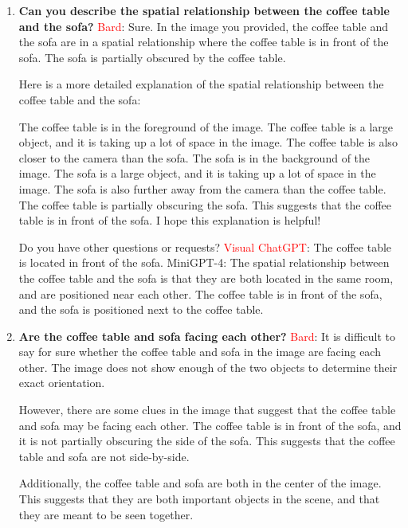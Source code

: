 \begin{enumerate}
    \item \textbf{Can you describe the spatial relationship between the coffee table and the sofa?}
    \subitem \textcolor{Red}{Bard}: 
    Sure. In the image you provided, the coffee table and the sofa are in a spatial relationship where the coffee table is in front of the sofa. The sofa is partially obscured by the coffee table.
    
    Here is a more detailed explanation of the spatial relationship between the coffee table and the sofa:
    
    The coffee table is in the foreground of the image. The coffee table is a large object, and it is taking up a lot of space in the image. The coffee table is also closer to the camera than the sofa.
    The sofa is in the background of the image. The sofa is a large object, and it is taking up a lot of space in the image. The sofa is also further away from the camera than the coffee table.
    The coffee table is partially obscuring the sofa. This suggests that the coffee table is in front of the sofa.
    I hope this explanation is helpful!
    
    Do you have other questions or requests?
    \subitem \textcolor{red}{Visual ChatGPT}: The coffee table is located in front of the sofa.
    \subitem MiniGPT-4: The spatial relationship between the coffee table and the sofa is that they are both located in the same room, and are positioned near each other. The coffee table is in front of the sofa, and the sofa is positioned next to the coffee table.
    \item \textbf{Are the coffee table and sofa facing each other?}
    \subitem \textcolor{Red}{Bard}: 
    It is difficult to say for sure whether the coffee table and sofa in the image are facing each other. The image does not show enough of the two objects to determine their exact orientation.
    
    However, there are some clues in the image that suggest that the coffee table and sofa may be facing each other. The coffee table is in front of the sofa, and it is not partially obscuring the side of the sofa. This suggests that the coffee table and sofa are not side-by-side.
    
    Additionally, the coffee table and sofa are both in the center of the image. This suggests that they are both important objects in the scene, and that they are meant to be seen together.
    

\end{enumerate}

